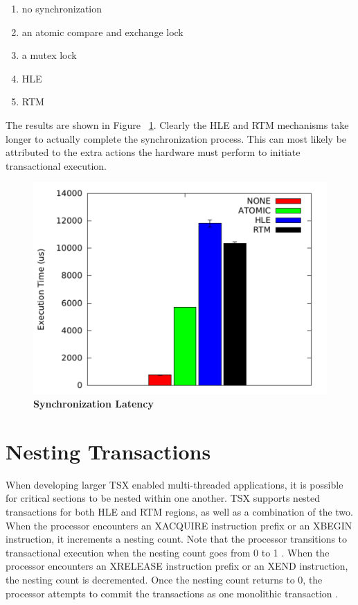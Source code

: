 \documentclass[11pt]{book}
\begin{document}
\begin{enumerate}
  \item no synchronization 
  \item an atomic compare and exchange lock
  \item a mutex lock
  \item HLE
  \item RTM
\end{enumerate}

The results are shown in Figure ~\ref{fig:tsx_latency}.  Clearly the HLE and RTM
mechanisms take longer to actually complete the synchronization process.  This can most
likely be attributed to the extra actions the hardware must perform to initiate
transactional execution.

\begin{figure}[H]
    \centering
    \graphicspath{ {./figures/} }
    \includegraphics[width=\textwidth,height=\textheight,keepaspectratio]{SyncBM}
    \caption{\textbf{Synchronization Latency}}
    \label{fig:tsx_latency}
\end{figure}

\section{Nesting Transactions}

When developing larger TSX enabled multi-threaded applications, it is possible for
critical sections to be nested within one another.  TSX supports nested transactions for
both HLE and RTM regions, as well as a combination of the two.  When the processor
encounters an XACQUIRE instruction prefix or an XBEGIN instruction, it increments a
nesting count.  Note that the processor transitions to transactional execution when the
nesting count goes from 0 to 1 \cite{intel_prog_ref}.  When the processor encounters an
XRELEASE instruction prefix or an XEND instruction, the nesting count is decremented.
Once the nesting count returns to 0, the processor attempts to commit the transactions as
one monolithic transaction \cite{intel_prog_ref}.
\end{document}

